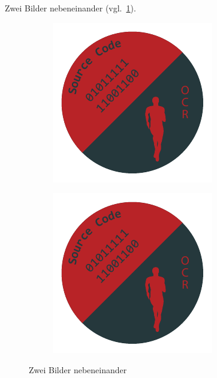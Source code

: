 \clearpage
Zwei Bilder nebeneinander (vgl.~\ref{fig:subfigure}). 
\begin{figure}
	\centering
	\begin{subfigure}[b]{0.2\textwidth}
		\centering
		\includegraphics[width=\textwidth]{content/bsp/logo.pdf}
	\end{subfigure}
	\begin{subfigure}[b]{0.2\textwidth}
		\centering
		\includegraphics[width=\textwidth]{content/bsp/logo.pdf}
	\end{subfigure}
	\caption{Zwei Bilder nebeneinander}\label{fig:subfigure}
\end{figure}


